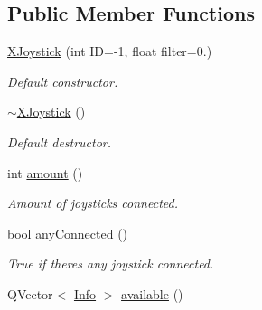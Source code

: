 \subsection*{Public Member Functions}
\begin{DoxyCompactItemize}
\item 
\hypertarget{class_x_joystick_a1d4f55adbffae86916947f248c9e5454}{}\hyperlink{class_x_joystick_a1d4f55adbffae86916947f248c9e5454}{X\+Joystick} (int I\+D=-\/1, float filter=0.)\label{class_x_joystick_a1d4f55adbffae86916947f248c9e5454}

\begin{DoxyCompactList}\small\item\em Default constructor. \end{DoxyCompactList}\item 
\hypertarget{class_x_joystick_a14ebfadbb78639e533368c620f8cdcb8}{}\hyperlink{class_x_joystick_a14ebfadbb78639e533368c620f8cdcb8}{$\sim$\+X\+Joystick} ()\label{class_x_joystick_a14ebfadbb78639e533368c620f8cdcb8}

\begin{DoxyCompactList}\small\item\em Default destructor. \end{DoxyCompactList}\item 
\hypertarget{class_x_joystick_a1b65862348fb552e9607c37e1bd2a90d}{}int \hyperlink{class_x_joystick_a1b65862348fb552e9607c37e1bd2a90d}{amount} ()\label{class_x_joystick_a1b65862348fb552e9607c37e1bd2a90d}

\begin{DoxyCompactList}\small\item\em Amount of joysticks connected. \end{DoxyCompactList}\item 
\hypertarget{class_x_joystick_a8323d85b5923ee80e619e685267d9e18}{}bool \hyperlink{class_x_joystick_a8323d85b5923ee80e619e685267d9e18}{any\+Connected} ()\label{class_x_joystick_a8323d85b5923ee80e619e685267d9e18}

\begin{DoxyCompactList}\small\item\em True if there\textquotesingle{}s any joystick connected. \end{DoxyCompactList}\item 
\hypertarget{class_x_joystick_ab8e3e56c7b8f6f0dec911f351b4b361e}{}Q\+Vector$<$ \hyperlink{struct_x_joystick_1_1_info}{Info} $>$ \hyperlink{class_x_joystick_ab8e3e56c7b8f6f0dec911f351b4b361e}{available} ()\label{class_x_joystick_ab8e3e56c7b8f6f0dec911f351b4b361e}


\end{DoxyCompactItemize}
